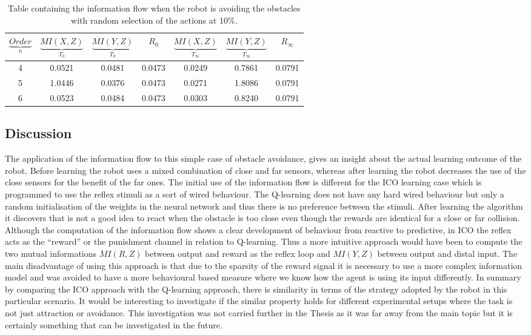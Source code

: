 \begin{table}[htbp]
\addtolength{\tabcolsep}{-2pt}
\centering
\begin{tabular}{| c|| c | c | c | c| c | c |}
\hline
$\underbrace{Order}_ n$& $\underbrace{MI(X,Z)}_{T_0}$& $\underbrace{MI(Y,Z)}_{T_0}$ & $R_0$ & $\underbrace{MI(X,Z)}_{T_\infty}$& $\underbrace{MI(Y,Z)}_{T_\infty}$ & $R_\infty$ \\
\hline
4 & 0.0521 & 0.0481 & 0.0473 & 0.0249 & 0.7861 & 0.0791 \\
\hline
5 & 1.0446 & 0.0376 & 0.0473 & 0.0271 & 1.8086 & 0.0791 \\
\hline
6 & 0.0523 & 0.0484 & 0.0473 & 0.0303 & 0.8240 & 0.0791 \\
\hline
\end{tabular}
\caption[Information flow for avoidance robot]{Table containing the information flow when
the robot is avoiding the obstacles with random selection of the actions at 10\%. \label{tab:Qlearning:infoflowtable-wrandom}}

\end{table}

\subsection{Discussion}
The application of the information flow to this simple case of obstacle avoidance,
gives an insight about the actual learning outcome of the robot.
Before learning the robot uses a mixed combination of close and far sensors,
whereas after learning the robot decreases the use of the close sensors
for the benefit of the far ones.
The initial use of the information flow is different for the ICO learning case
which is programmed to use the reflex stimuli as a sort of wired behaviour.
The Q-learning does not have any hard wired behaviour but only a random
initialisation of the weights in the neural network and thus there is no preference
between the stimuli.
After learning the algorithm it discovers that is not a good idea to react
when the obstacle is too close even though the rewards are identical for
a close or far collision.
Although the computation of the information flow shows a clear development of 
behaviour from reactive to predictive, in ICO the reflex acts as the ``reward'' or 
the punishment channel in relation to Q-learning.
Thus a more intuitive approach would have been to compute the two mutual 
informations $MI(R,Z)$ between output and reward as the reflex loop and $MI(Y,Z)$
between output and distal input.
The main disadvantage of using this approach is that due to the sparsity of the 
reward signal it is necessary to use a more complex information model and was avoided
to have a more behavioural based measure where we know how the agent is using
its input differently.
In summary by comparing the ICO approach with the Q-learning approach,
there is similarity in terms of the strategy adopted by the robot in this particular
scenario.
It would be interesting to investigate if the similar property holds for
different experimental setups where the task is not just attraction or avoidance.
This investigation was not carried further in the Thesis as it was far away from the
main topic but it is certainly something that can be investigated in the future.

